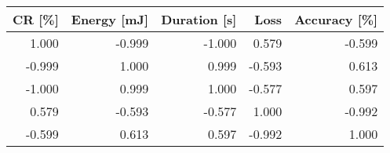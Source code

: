 \begin{tabular}{rrrrr}
\toprule
    CR [\%] & Energy [mJ] & Duration [s] &       Loss & Accuracy [\%] \\
\midrule
     1.000 &      -0.999 &       -1.000 &      0.579 &       -0.599 \\
    -0.999 &       1.000 &        0.999 &     -0.593 &        0.613 \\
    -1.000 &       0.999 &        1.000 &     -0.577 &        0.597 \\
     0.579 &      -0.593 &       -0.577 &      1.000 &       -0.992 \\
    -0.599 &       0.613 &        0.597 &     -0.992 &        1.000 \\
\bottomrule
\end{tabular}
